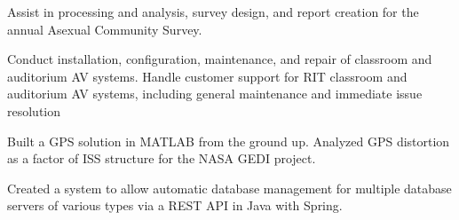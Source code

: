 \documentclass[10pt,a4paper]{altacv}
\begin{document}

\begin{fullwidth}
\marginpar{\makesidebarheader}
    \vspace*{-1\baselineskip}
\makecvheader
\end{fullwidth}

Assist in processing and analysis, survey design, and report creation for the annual Asexual Community Survey.

\divider

Conduct installation, configuration, maintenance, and repair of classroom and auditorium AV systems.
Handle customer support for RIT classroom and auditorium AV systems, including general maintenance and immediate issue resolution

\divider

Built a GPS solution in MATLAB from the ground up. Analyzed GPS distortion as a factor of ISS structure for the NASA GEDI project.


Created a system to allow automatic database management for multiple database servers of various types via a REST API in Java with Spring.
\end{document}

